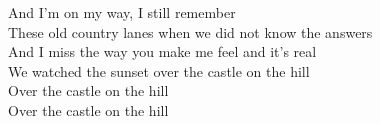 \cho{}
And I'm on my way, I still remember\\
These old country lanes when we did not know the answers\\
And I miss the way you make me feel and it's real\\
We watched the sunset over the castle on the hill\\
 \quad {}Over the castle on the hill\\
 \quad {}Over the castle on the hill

\esong{}
 
